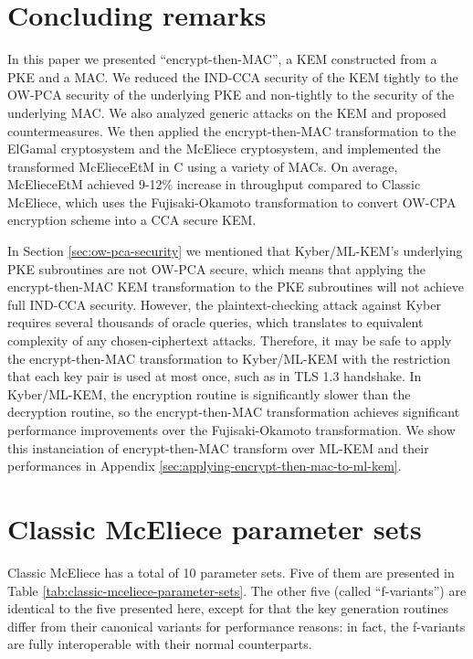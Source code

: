 \documentclass[runningheads]{llncs}
\begin{document}
\section{Concluding remarks}\label{sec:conclusion}
In this paper we presented ``encrypt-then-MAC'', a KEM constructed from a PKE and a MAC. We reduced the IND-CCA security of the KEM tightly to the OW-PCA security of the underlying PKE and non-tightly to the security of the underlying MAC. We also analyzed generic attacks on the KEM and proposed countermeasures. We then applied the encrypt-then-MAC transformation to the ElGamal cryptosystem and the McEliece cryptosystem, and implemented the transformed McElieceEtM in C using a variety of MACs. On average, McElieceEtM achieved 9-12\% increase in throughput compared to Classic McEliece, which uses the Fujisaki-Okamoto transformation to convert OW-CPA encryption scheme into a CCA secure KEM.

In Section \ref{sec:ow-pca-security} we mentioned that Kyber/ML-KEM's underlying PKE subroutines are not OW-PCA secure, which means that applying the encrypt-then-MAC KEM transformation to the PKE subroutines will not achieve full IND-CCA security. However, the plaintext-checking attack against Kyber requires several thousands of oracle queries, which translates to equivalent complexity of any chosen-ciphertext attacks. Therefore, it may be safe to apply the encrypt-then-MAC transformation to Kyber/ML-KEM with the restriction that each key pair is used at most once, such as in TLS 1.3 handshake. In Kyber/ML-KEM, the encryption routine is significantly slower than the decryption routine, so the encrypt-then-MAC transformation achieves significant performance improvements over the Fujisaki-Okamoto transformation. We show this instanciation of encrypt-then-MAC transform over ML-KEM and their performances in  Appendix \ref{sec:applying-encrypt-then-mac-to-ml-kem}. 





\appendix
\section{Classic McEliece parameter sets}\label{sec:classic-mceliece-parameter-sets}
Classic McEliece has a total of 10 parameter sets. Five of them are presented in Table \ref{tab:classic-mceliece-parameter-sets}. The other five (called ``f-variants'') are identical to the five presented here, except for that the key generation routines differ from their canonical variants for performance reasons: in fact, the f-variants are fully interoperable with their normal counterparts.
\end{document}

